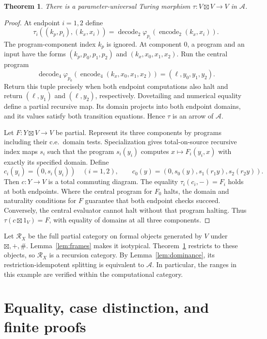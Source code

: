 \documentclass[11pt]{article}
\newtheorem{theorem}{Theorem}[section]
\newcommand{\A}{\mathscr A}
\begin{document}
\begin{theorem}\label{thm:turing}
There is a parameter-universal Turing morphism
$\tau:V\boxtimes V\to V$ in $\A$.
\end{theorem}
\begin{proof}
At endpoint $i=1,2$ define
\[
 \tau_i((k_p,p_i),(k_x,x_i))
   =\operatorname{decode}_2
      \varphi_{p_i}(\operatorname{encode}_2(k_x,x_i)).
\]
The program-component index $k_p$ is ignored.
At component $0$, a program and an input have the forms
$(k_p,p_0,p_1,p_2)$ and $(k_x,x_0,x_1,x_2)$.
Run the central program
\[
 \operatorname{decode}_4
 \varphi_{p_0}(\operatorname{encode}_4(k_x,x_0,x_1,x_2))
       =(\ell,y_0,y_1,y_2).
\]
Return this tuple precisely when both endpoint computations also
halt and return $(\ell,y_1)$ and $(\ell,y_2)$, respectively.
Dovetailing and numerical equality define a partial recursive map.
Its domain projects into both endpoint domains, and its values
satisfy both transition equations. Hence $\tau$ is an arrow of $\A$.

Let $F:Y\boxtimes V\to V$ be partial. Represent its three
components by programs including their c.e.\ domain tests.
Specialization gives total-on-source recursive index maps $s_i$
such that the program $s_i(y_i)$ computes
$x\mapsto F_i(y_i,x)$ with exactly its specified domain.
Define
\[
 c_i(y_i)=(0,s_i(y_i))\quad(i=1,2),\qquad
 c_0(y)=(0,s_0(y),s_1(r_1y),s_2(r_2y)).
\]
Then $c:Y\to V$ is a total commuting diagram.
The equality $\tau_i(c_i,-)=F_i$ holds at both endpoints.
Where the central program for $F_0$ halts, the domain and
naturality conditions for $F$ guarantee that both endpoint
checks succeed. Conversely, the central evaluator cannot halt
without that program halting. Thus
$\tau(c\boxtimes1_V)=F$, with equality of domains at all
three components.
\end{proof}

Let $\mathscr R_X$ be the full partial category on formal objects
generated by $V$ under $\boxtimes,+,\#$.
Lemma~\ref{lem:frames} makes it isotypical.
Theorem~\ref{thm:turing} restricts to these objects, so
$\mathscr R_X$ is a recursion category.
By Lemma~\ref{lem:dominance}, its restriction-idempotent splitting
is equivalent to $\A$. In particular, the ranges in this
example are verified within the computational category.

\section{Equality, case distinction, and finite proofs}
\end{document}
